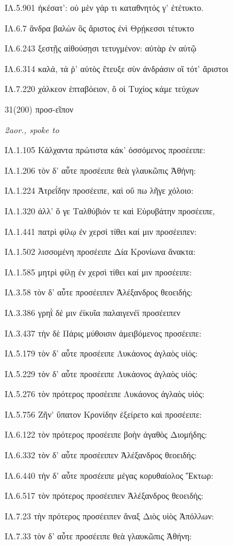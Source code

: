 \begin{enumerate}
{ΙΛ.5.901 ἠκέσατ': οὐ μὲν γάρ τι καταθνητός γ' ἐτέτυκτο.

ΙΛ.6.7 ἄνδρα βαλὼν ὃς ἄριστος ἐνὶ Θρῄκεσσι τέτυκτο

ΙΛ.6.243 ξεστῇς αἰθούσῃσι τετυγμένον: αὐτὰρ ἐν αὐτῷ

ΙΛ.6.314 καλά, τά ῥ' αὐτὸς ἔτευξε σὺν ἀνδράσιν οἳ τότ' ἄριστοι

ΙΛ.7.220 χάλκεον ἑπταβόειον, ὅ οἱ Τυχίος κάμε τεύχων
}

\clearpage
\item[\large 31(200) ]{\large \g  προσ-εῖπον    }

\hspace{0.2cm} \textit{  2aor., spoke to }

{\g
ΙΛ.1.105 Κάλχαντα πρώτιστα κάκ' ὀσσόμενος προσέειπε:

ΙΛ.1.206 τὸν δ' αὖτε προσέειπε θεὰ γλαυκῶπις Ἀθήνη:

ΙΛ.1.224 Ἀτρεΐδην προσέειπε, καὶ οὔ πω λῆγε χόλοιο:

ΙΛ.1.320 ἀλλ' ὅ γε Ταλθύβιόν τε καὶ Εὐρυβάτην προσέειπε,

ΙΛ.1.441 πατρὶ φίλῳ ἐν χερσὶ τίθει καί μιν προσέειπεν:

ΙΛ.1.502 λισσομένη προσέειπε Δία Κρονίωνα ἄνακτα:

ΙΛ.1.585 μητρὶ φίλῃ ἐν χερσὶ τίθει καί μιν προσέειπε:

ΙΛ.3.58 τὸν δ' αὖτε προσέειπεν Ἀλέξανδρος θεοειδής:

ΙΛ.3.386 γρηῒ δέ μιν ἐϊκυῖα παλαιγενέϊ προσέειπεν

ΙΛ.3.437 τὴν δὲ Πάρις μύθοισιν ἀμειβόμενος προσέειπε:

ΙΛ.5.179 τὸν δ' αὖτε προσέειπε Λυκάονος ἀγλαὸς υἱός:

ΙΛ.5.229 τὸν δ' αὖτε προσέειπε Λυκάονος ἀγλαὸς υἱός:

ΙΛ.5.276 τὸν πρότερος προσέειπε Λυκάονος ἀγλαὸς υἱός:

ΙΛ.5.756 Ζῆν' ὕπατον Κρονίδην ἐξείρετο καὶ προσέειπε:

ΙΛ.6.122 τὸν πρότερος προσέειπε βοὴν ἀγαθὸς Διομήδης:

ΙΛ.6.332 τὸν δ' αὖτε προσέειπεν Ἀλέξανδρος θεοειδής:

ΙΛ.6.440 τὴν δ' αὖτε προσέειπε μέγας κορυθαίολος Ἕκτωρ:

ΙΛ.6.517 τὸν πρότερος προσέειπεν Ἀλέξανδρος θεοειδής:

ΙΛ.7.23 τὴν πρότερος προσέειπεν ἄναξ Διὸς υἱὸς Ἀπόλλων:

ΙΛ.7.33 τὸν δ' αὖτε προσέειπε θεὰ γλαυκῶπις Ἀθήνη:
}


\end{enumerate}
